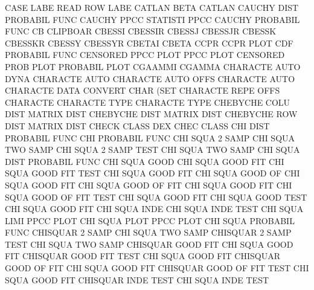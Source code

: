 CASE     LABE                           READ     ROW  LABE
CATLAN   BETA                           CATLAN
CAUCHY   DIST                           PROBABIL FUNC
CAUCHY   PPCC                           STATISTI PPCC
CAUCHY                                  PROBABIL FUNC
CB                                      CLIPBOAR
CBESSI                                  CBESSIR
CBESSJ                                  CBESSJR
CBESSK                                  CBESSKR
CBESSY                                  CBESSYR
CBETAI                                  CBETA
CCPR                                    CCPR     PLOT
CDF                                     PROBABIL FUNC
CENSORED PPCC PLOT                      PPCC     PLOT
CENSORED PROB PLOT                      PROBABIL PLOT
CGAAMMI                                 CGAMMA
CHARACTE AUTO DYNA                      CHARACTE AUTO
CHARACTE AUTO OFFS                      CHARACTE AUTO
CHARACTE DATA                           CONVERT  CHAR (SET
CHARACTE REPE OFFS                      CHARACTE
CHARACTE TYPE                           CHARACTE TYPE
CHEBYCHE COLU DIST                      MATRIX   DIST
CHEBYCHE DIST                           MATRIX   DIST
CHEBYCHE ROW  DIST                      MATRIX   DIST
CHECK    CLASS                          DEX      CHEC CLASS
CHI      DIST                           PROBABIL FUNC
CHI                                     PROBABIL FUNC
CHI      SQUA 2    SAMP                 CHI      SQUA TWO  SAMP
CHI      SQUA 2    SAMP TEST            CHI      SQUA TWO  SAMP
CHI      SQUA DIST                      PROBABIL FUNC
CHI      SQUA GOOD                      CHI      SQUA GOOD FIT
CHI      SQUA GOOD FIT  TEST            CHI      SQUA GOOD FIT
CHI      SQUA GOOD OF                   CHI      SQUA GOOD FIT
CHI      SQUA GOOD OF   FIT             CHI      SQUA GOOD FIT
CHI      SQUA GOOD OF   FIT  TEST       CHI      SQUA GOOD FIT
CHI      SQUA GOOD TEST                 CHI      SQUA GOOD FIT
CHI      SQUA INDE                      CHI      SQUA INDE TEST
CHI      SQUA LIMI                      PPCC     PLOT
CHI      SQUA PLOT                      PPCC     PLOT
CHI      SQUA                           PROBABIL FUNC
CHISQUAR 2    SAMP                      CHI      SQUA TWO  SAMP
CHISQUAR 2    SAMP TEST                 CHI      SQUA TWO  SAMP
CHISQUAR GOOD FIT                       CHI      SQUA GOOD FIT
CHISQUAR GOOD FIT  TEST                 CHI      SQUA GOOD FIT
CHISQUAR GOOD OF   FIT                  CHI      SQUA GOOD FIT
CHISQUAR GOOD OF   FIT  TEST            CHI      SQUA GOOD FIT
CHISQUAR INDE TEST                      CHI      SQUA INDE TEST
